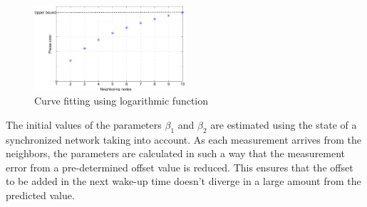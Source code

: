 \documentclass[journal]{IEEEtran}
\begin{document}
\begin{figure}
\centering
\includegraphics[width=0.5\textwidth]{curvefit}
\caption{Curve fitting using logarithmic function} \label{curvefit}
\end{figure}
\par
The initial values of the parameters $\beta_1$ and $\beta_2$ are
estimated using the state of a synchronized network taking into
account. As each measurement arrives from the neighbors, the
parameters are calculated in such a way that the measurement error
from a pre-determined offset value is reduced. This ensures that the
offset to be added in the next wake-up time doesn't diverge in a
large amount from the predicted value.
\end{document}
